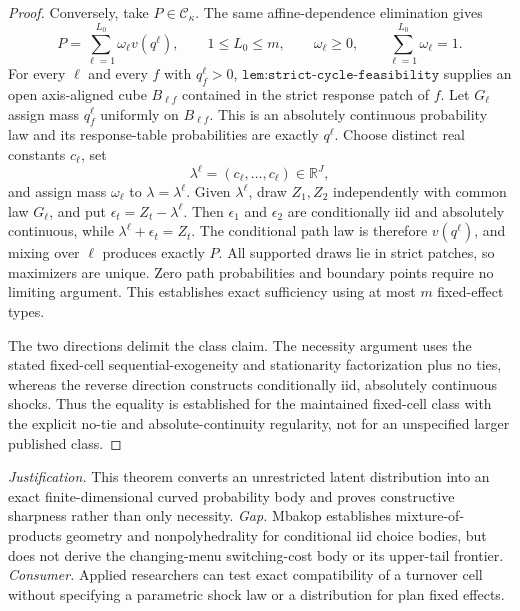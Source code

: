 \documentclass{article}
\begin{document}
\begin{proof}
Conversely, take \(P\in\mathcal C_\kappa\).  The same affine-dependence elimination gives
\[
 P=\sum_{\ell=1}^{L_0}\omega_\ell v(q^\ell),
 \qquad
 1\le L_0\le m,
 \qquad
 \omega_\ell\ge0,
 \qquad
 \sum_{\ell=1}^{L_0}\omega_\ell=1.
\]
For every \(\ell\) and every \(f\) with \(q_f^\ell>0\), \(\texttt{lem:strict-cycle-feasibility}\) supplies an open axis-aligned cube \(B_{\ell f}\) contained in the strict response patch of \(f\).  Let \(G_\ell\) assign mass \(q_f^\ell\) uniformly on \(B_{\ell f}\).  This is an absolutely continuous probability law and its response-table probabilities are exactly \(q^\ell\).  Choose distinct real constants \(c_\ell\), set
\[
 \lambda^\ell=(c_\ell,\ldots,c_\ell)\in\mathbb R^J,
\]
and assign mass \(\omega_\ell\) to \(\lambda=\lambda^\ell\).  Given \(\lambda^\ell\), draw \(Z_1,Z_2\) independently with common law \(G_\ell\), and put \(\epsilon_t=Z_t-\lambda^\ell\).  Then \(\epsilon_1\) and \(\epsilon_2\) are conditionally iid and absolutely continuous, while \(\lambda^\ell+\epsilon_t=Z_t\).  The conditional path law is therefore \(v(q^\ell)\), and mixing over \(\ell\) produces exactly \(P\).  All supported draws lie in strict patches, so maximizers are unique.  Zero path probabilities and boundary points require no limiting argument.  This establishes exact sufficiency using at most \(m\) fixed-effect types.

The two directions delimit the class claim.  The necessity argument uses the stated fixed-cell sequential-exogeneity and stationarity factorization plus no ties, whereas the reverse direction constructs conditionally iid, absolutely continuous shocks.  Thus the equality is established for the maintained fixed-cell class with the explicit no-tie and absolute-continuity regularity, not for an unspecified larger published class.
\end{proof}
\par\smallskip\noindent \textit{Justification.} This theorem converts an unrestricted latent distribution into an exact finite-dimensional curved probability body and proves constructive sharpness rather than only necessity. \textit{Gap.} Mbakop establishes mixture-of-products geometry and nonpolyhedrality for conditional iid choice bodies, but does not derive the changing-menu switching-cost body or its upper-tail frontier. \textit{Consumer.} Applied researchers can test exact compatibility of a turnover cell without specifying a parametric shock law or a distribution for plan fixed effects.
\end{document}
